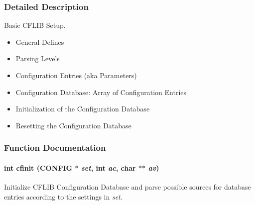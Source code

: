 \subsubsection{Detailed Description}
Basic CFLIB Setup. 

\begin{itemize}
\item General Defines\item Parsing Levels\item Configuration Entries (aka Parameters)\item Configuration Database: Array of Configuration Entries\item Initialization of the Configuration Database\item Resetting the Configuration Database \end{itemize}


\subsubsection{Function Documentation}
\hypertarget{group__cflib__core_ge593ff607f853bd5fc16a16bb6759314}{
\paragraph[{cfinit}]{\setlength{\rightskip}{0pt plus 5cm}int cfinit ({\bf CONFIG} $\ast$ {\em set}, \/  int {\em ac}, \/  char $\ast$$\ast$ {\em av})}\hfill}
\label{group__cflib__core_ge593ff607f853bd5fc16a16bb6759314}


Initialize CFLIB Configuration Database and parse possible sources for database entries according to the settings in {\em set\/}. 

